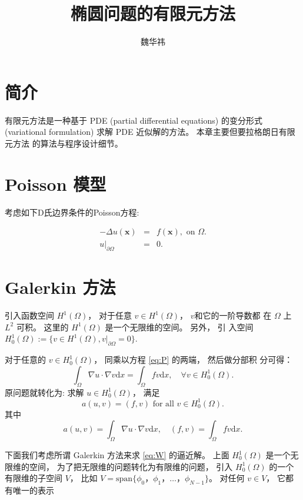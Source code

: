 \documentclass{article}
\begin{document}
\title{椭圆问题的有限元方法}
\author{魏华祎}
\date{\chntoday}
\maketitle
\section{简介}

有限元方法是一种基于 PDE (partial differential equations) 的变分形式
(variational formulation) 求解 PDE 近似解的方法。 本章主要但要拉格朗日有限元方法
的算法与程序设计细节。

\section{Poisson 模型}

考虑如下D氏边界条件的Poisson方程:

\begin{eqnarray}
    -\Delta u(\mathbf x) &=& f(\mathbf x),\text{ on } \Omega.\label{eq:P}\\
    u|_{\partial\Omega} &=& 0.
\end{eqnarray}

\section{Galerkin 方法}

引入函数空间 $H^1(\Omega)$， 对于任意 $v \in H^1(\Omega)$， $v$和它的一阶导数都
在 $\Omega$ 上 $L^2$ 可积。 这里的 $H^1(\Omega)$ 是一个无限维的空间。 另外， 引
入空间 $H^1_0(\Omega) := \{v\in H^1(\Omega), v|_{\partial\Omega} = 0\}$.

对于任意的 $v\in H^1_0(\Omega)$， 同乘以方程 \eqref{eq:P} 的两端， 然后做分部积
分可得：
\begin{equation}\label{eq:wg}
    \int_{\Omega}\nabla u\cdot\nabla v\mathrm{d}x = \int_{\Omega}fv\mathrm{d}x,
    \quad\forall v \in H^1_0(\Omega).
\end{equation}
原问题就转化为: 求解 $u\in H_0^1(\Omega)$， 满足
\begin{equation}\label{eq:W}
    a(u, v) = (f,v) \text{ for all }v\in H_0^1(\Omega).
\end{equation}
其中
$$
a(u, v) = \int_{\Omega}\nabla u\cdot\nabla v\mathrm{d}x,
\quad (f,v) =  \int_{\Omega}fv\mathrm{d}x.
$$

下面我们考虑所谓 Galerkin 方法来求 \eqref{eq:W} 的逼近解。 上面 $H_0^1(\Omega)$
是一个无限维的空间， 为了把无限维的问题转化为有限维的问题， 引入 $H_0^1(\Omega)$
的一个有限维的子空间 $V$， 比如 $V=\mathrm{span}\{\phi_0，\phi_1，\ldots，
\phi_{N-1}\}$。 对任何 $v \in V$， 它都有唯一的表示
\end{document}
